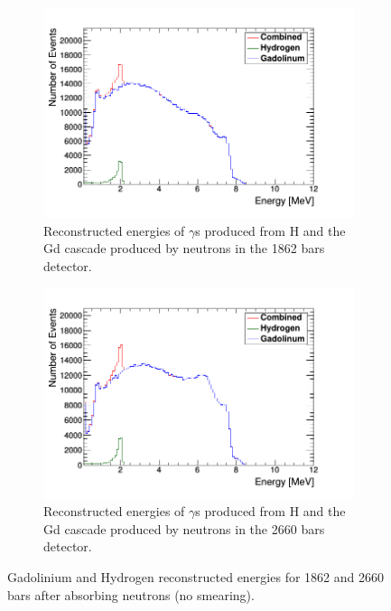 \documentclass[12pt,a4paper]{article}
\begin{document}
\begin{figure}[H]
\centering
\begin{subfigure}{.5\textwidth}
  \centering
  \includegraphics[width=\linewidth]{neutron_2000_bars_Gd_H.png}
  \captionsetup{width=.9\linewidth}
  \caption{Reconstructed energies of $\gamma$s produced from H and the Gd cascade produced by neutrons in the 1862 bars detector.}
  \label{sub_2000_gd_h}
\end{subfigure}%
\begin{subfigure}{.5\textwidth}
  \centering
  \includegraphics[width=\linewidth]{neutron_3000_bars_Gd_H.png}
  \captionsetup{width=.9\linewidth}
  \caption{Reconstructed energies of $\gamma$s produced from H and the Gd cascade produced by neutrons in the 2660 bars detector.}
  \label{sub_3000_gd_h}
\end{subfigure}
\caption{Gadolinium and Hydrogen reconstructed energies for 1862 and 2660 bars after absorbing neutrons (no smearing).}
\label{3000_2000_gd_h}
\end{figure}
\end{document}
